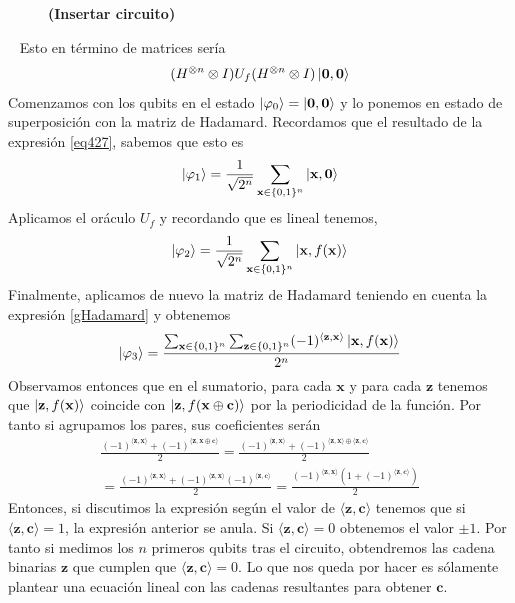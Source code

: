 \documentclass[a4paper]{article}
\numberwithin{equation}{section}
\begin{document}
\begin{figure}[h]
\textbf{(Insertar circuito)}
\end{figure}\ \linebreak
Esto en término de matrices sería
\begin{equation}
(H^{\otimes n}\otimes I) U_f (H^{\otimes n}\otimes I)\ket{\mathbf{0}, \mathbf{0}}
\end{equation}
Comenzamos con los qubits en el estado $\ket{\varphi_0} = \ket{\mathbf{0}, \mathbf{0}}$ y lo ponemos en estado de superposición con la matriz de Hadamard. Recordamos que el resultado de la expresión \ref{eq427}, sabemos que esto es
\begin{equation}
\ket{\varphi_1} =
\frac{1}{\sqrt{2^n}} \sum_{\mathbf{x}\in\{0,1\}^n} \ket{\mathbf{x}, \mathbf{0}}
\end{equation}
Aplicamos el oráculo $U_f$ y recordando que es lineal tenemos,
\begin{equation}
\ket{\varphi_2} =
\frac{1}{\sqrt{2^n}} \sum_{\mathbf{x}\in\{0,1\}^n} \ket{\mathbf{x}, f(\mathbf{x})}
\end{equation}
Finalmente, aplicamos de nuevo la matriz de Hadamard teniendo en cuenta la expresión \ref{gHadamard} y obtenemos
\begin{equation}
\ket{\varphi_3} =
\frac{ \sum_{\mathbf{x}\in\{0,1\}^n} \sum_{\mathbf{z}\in\{0,1\}^n} (-1)^{\langle \mathbf{z}, \mathbf{x} \rangle} \ket{\mathbf{x}, f(\mathbf{x})} } {2^n}
\end{equation}
Observamos entonces que en el sumatorio, para cada $\mathbf{x}$ y para cada $\mathbf{z}$ tenemos que $\ket{\mathbf{z}, f(\mathbf{x})}$ coincide con $\ket{\mathbf{z}, f(\mathbf{x}\oplus\mathbf{c})}$ por la periodicidad de la función. Por tanto si agrupamos los pares, sus coeficientes serán
\begin{equation}
\begin{split}
\frac{(-1)^{\langle\mathbf{z}, \mathbf{x}\rangle} + (-1)^{\langle\mathbf{z}, \mathbf{x}\oplus\mathbf{c}\rangle}}{2}
= 
\frac{(-1)^{\langle\mathbf{z}, \mathbf{x}\rangle} + (-1)^{\langle\mathbf{z}, \mathbf{x}\rangle \oplus \langle \mathbf{z}, \mathbf{c}\rangle}}{2}
\\=
\frac{(-1)^{\langle\mathbf{z}, \mathbf{x}\rangle} + (-1)^{\langle\mathbf{z}, \mathbf{x}\rangle}(-1)^{ \langle \mathbf{z}, \mathbf{c}\rangle}}{2}
=
\frac{(-1)^{\langle\mathbf{z}, \mathbf{x}\rangle} (1 + (-1)^{ \langle \mathbf{z}, \mathbf{c}\rangle})}{2}
\end{split}
\end{equation}
Entonces, si discutimos la expresión según el valor de $\langle \mathbf{z}, \mathbf{c} \rangle$ tenemos que si $\langle \mathbf{z}, \mathbf{c} \rangle = 1$, la expresión anterior se anula. Si $\langle \mathbf{z}, \mathbf{c} \rangle = 0$ obtenemos el valor $\pm 1$. Por tanto si medimos los $n$ primeros qubits tras el circuito, obtendremos las cadena binarias $\mathbf{z}$ que cumplen que $\langle \mathbf{z}, \mathbf{c} \rangle = 0$. Lo que nos queda por hacer es sólamente plantear una ecuación lineal con las cadenas resultantes para obtener $\mathbf{c}$.
\end{document}
